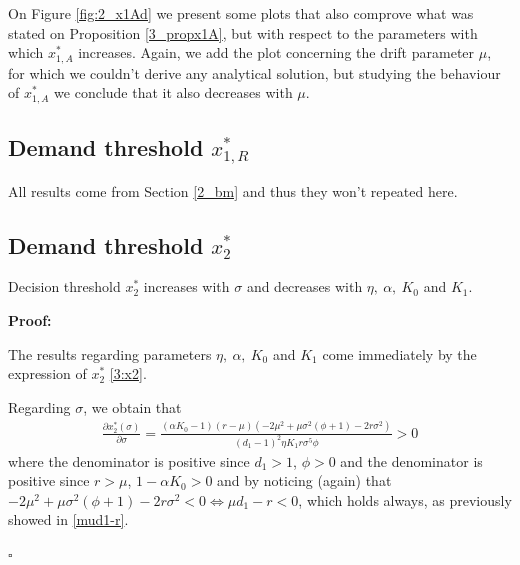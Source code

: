 On Figure \ref{fig:2_x1Ad} we present some plots that also comprove what was stated on Proposition \ref{3_propx1A}, but with respect to the parameters with which $x_{1,A}^*$ increases. Again, we add the plot concerning the drift parameter $\mu$, for which we couldn't derive any analytical solution, but studying the behaviour of $x^*_{1,A}$ we conclude that it also decreases with $\mu$.


\subsection{Demand threshold $x_{1,R}^*$}
\label{3_dmx1R}

All results come from Section \ref{2_bm} and thus they won't repeated here.



\subsection{Demand threshold $x_2^*$}
	\label{3_dmx2}
	
\begin{prop}
	\label{3_propx2}
	Decision threshold $x_2^*$ increases with $\sigma$ and decreases with $\eta, \ \alpha, \ K_0$ and $K_1$.
\end{prop}

\textbf{Proof:}

The results regarding parameters $\eta, \ \alpha, \ K_0$ and $K_1$ come immediately by the expression of $x_2^*$  \eqref{3:x2}.

Regarding $\sigma$, we obtain that
\begin{align*}
\frac{\partial x_2^* ( \sigma) }{\partial \sigma}=
\frac{(\alpha  K_0-1) (r-\mu) \left(-2 \mu ^2+\mu  \sigma ^2 \left(\phi+1\right)-2 r \sigma ^2\right)}{(d_1-1)^2 \eta  K_1 r \sigma ^5 \phi}>0
\end{align*}
where the denominator is positive since $d_1>1$, $\phi>0$  and the denominator is positive since $r>\mu$, $1-\alpha K_0>0$ and by noticing (again) that $-2 \mu ^2+\mu  \sigma ^2 \left(\phi+1\right)-2 r \sigma ^2<0 \Leftrightarrow \mu d_1-r<0$, which holds always, as previously showed in \eqref{mud1-r}.

\begin{flushright}
	$\square$
\end{flushright}

